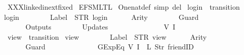 %
\begin{isabellebody}%
%
%
\isadelimtheory
%
\endisadelimtheory
%
\isatagtheory
{}\isamarkupfalse%
\ XXXlinkedin{\isacharunderscore}ext{\isacharunderscore}fixed\isanewline
{}\ {\isachardoublequoteopen}{\isachardot}{\isachardot}{\isacharslash}{\isachardot}{\isachardot}{\isacharslash}EFSM{\isacharunderscore}LTL{\isachardoublequoteclose}\isanewline
{}%
\endisatagtheory
{\isafoldtheory}%
%
\isadelimtheory
\isanewline
%
\endisadelimtheory
\isanewline
{}\isamarkupfalse%
\ One{\isacharunderscore}nat{\isacharunderscore}def\ {\isacharbrackleft}simp\ del{\isacharbrackright}\isanewline
\isanewline
{}\isamarkupfalse%
\ {\isachardoublequoteopen}login{\isachardoublequoteclose}\ {\isacharcolon}{\isacharcolon}\ {\isachardoublequoteopen}transition{\isachardoublequoteclose}\ \isanewline
{\isachardoublequoteopen}login\ {\isasymequiv}\ {\isasymlparr}\isanewline
\ \ \ \ \ \ Label\ {\isacharequal}\ STR\ {\isacharprime}{\isacharprime}login{\isacharprime}{\isacharprime}{\isacharcomma}\isanewline
\ \ \ \ \ \ Arity\ {\isacharequal}\ {}{\isacharcomma}\isanewline
\ \ \ \ \ \ Guard\ {\isacharequal}\ {\isacharbrackleft}{\isacharbrackright}{\isacharcomma}\isanewline
\ \ \ \ \ \ Outputs\ {\isacharequal}\ {\isacharbrackleft}{\isacharbrackright}{\isacharcomma}\isanewline
\ \ \ \ \ \ Updates\ {\isacharequal}\ {\isacharbrackleft}\isanewline
\ \ \ \ \ \ \ \ \ \ \ \ {\isacharparenleft}{}{\isacharcomma}\ {\isacharparenleft}V\ {\isacharparenleft}I\ {}{\isacharparenright}{\isacharparenright}{\isacharparenright}\isanewline
\ \ \ \ \ \ {\isacharbrackright}\isanewline
{\isasymrparr}{\isachardoublequoteclose}\isanewline
\isanewline
{}\isamarkupfalse%
\ {\isachardoublequoteopen}view{\isachardoublequoteclose}\ {\isacharcolon}{\isacharcolon}\ {\isachardoublequoteopen}transition{\isachardoublequoteclose}\ \isanewline
{\isachardoublequoteopen}view\ {\isasymequiv}\ {\isasymlparr}\isanewline
\ \ \ \ \ \ Label\ {\isacharequal}\ STR\ {\isacharprime}{\isacharprime}view{\isacharprime}{\isacharprime}{\isacharcomma}\isanewline
\ \ \ \ \ \ Arity\ {\isacharequal}\ {}{\isacharcomma}\isanewline
\ \ \ \ \ \ Guard\ {\isacharequal}\ {\isacharbrackleft}\isanewline
\ \ \ \ \ \ \ \ \ \ \ \ GExp{\isachardot}Eq\ {\isacharparenleft}V\ {\isacharparenleft}I\ {}{\isacharparenright}{\isacharparenright}\ {\isacharparenleft}L\ {\isacharparenleft}Str\ {\isacharprime}{\isacharprime}friendID{\isacharprime}{\isacharprime}{\isacharparenright}{\isacharparenright}{\isacharcomma}\isanewline

\end{isabellebody}
